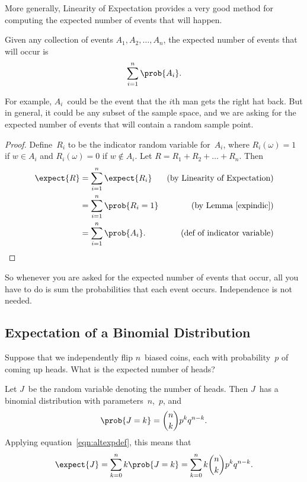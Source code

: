 More generally, Linearity of Expectation provides a very good method
for computing the expected number of events that will happen.

\begin{theorem}\label{thm:17T3}
Given any collection of events $A_1, A_2, \dots, A_n$, the expected
number of events that will occur is
\begin{equation*}
    \sum_{i = 1}^n \prob{A_i}.
\end{equation*}
\end{theorem}

For example, $A_i$~could be the event that the $i$th man gets the
right hat back.  But in general, it could be any subset of the sample
space, and we are asking for the expected number of events that will
contain a random sample point.

\begin{proof}

Define~$R_i$ to be the indicator random variable for~$A_i$, where
$R_i(\omega) = 1$ if $w \in A_i$ and $R_i(\omega) = 0$ if $w \notin A_i$.  Let
$R = R_1 + R_2 + \dots + R_n$.  Then
\begin{align*}
\expect{R}
    &= \sum_{i = 1}^n \expect{R_i}
    & \text{(by Linearity of Expectation)}\\
%
    &= \sum_{i = 1}^n \prob{R_i = 1}
    & \text{(by Lemma~\ref{expindic})}\\
%
%
    &= \sum_{i = 1}^n \prob{A_i}. \qedhere  
        & \text{(def of indicator variable)}\\
\end{align*}
\end{proof}

So whenever you are asked for the expected number of events that occur,
all you have to do is sum the probabilities that each event occurs.
Independence is not needed.

\subsection{Expectation of a Binomial Distribution}

Suppose that we independently flip $n$~biased coins, each with
probability~$p$ of coming up heads.  What is the expected number of
heads?

Let $J$~be the random variable denoting the number of heads.  Then
$J$~has a binomial distribution with parameters~$n$,~$p$, and
\begin{equation*}
    \prob{J = k} = \binom{n}{k} p^k q^{n - k}.
\end{equation*}
Applying equation~\eqref{eqn:altexpdef}, this means that
\begin{equation} \label{eqn:17T7}
\expect{J}
    = \sum_{k = 0}^n k \prob{J = k}
    = \sum_{k = 0}^n k \binom{n}{k} p^k q^{n - k}.
\end{equation}

